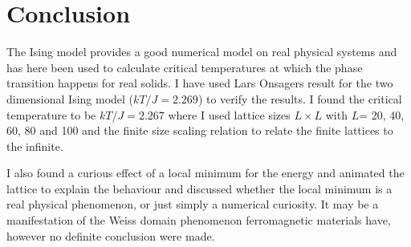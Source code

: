 \documentclass[twoside, 11pt]{article}
\begin{document}
\section{Conclusion}
	The Ising model provides a good numerical model on real physical systems and has here been used to calculate critical temperatures at which the phase transition happens for real solids. I have used Lars Onsagers result for the two dimensional Ising model ($kT/J=2.269$) to verify the results. I found the critical temperature to be $kT/J = 2.267$ where I used lattice sizes $L\times L$ with $L$= 20, 40, 60, 80 and 100 and the finite size scaling relation to relate the finite lattices to the infinite. 
	
	I also found a curious effect of a local minimum for the energy and animated the lattice to explain the behaviour and discussed whether the local minimum is a real physical phenomenon, or just simply a numerical curiosity. It may be a manifestation of the Weiss domain phenomenon ferromagnetic materials have, however no definite conclusion were made.

%
%


\end{document}
